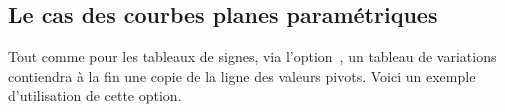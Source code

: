 \documentclass{tutodoc}
\begin{document}

\subsection{Le cas des courbes planes paramétriques}

Tout comme pour les tableaux de signes, via l'option \,, un tableau de variations contiendra à la fin une copie de la ligne des valeurs pivots. Voici un exemple d'utilisation de cette option.
\end{document}
